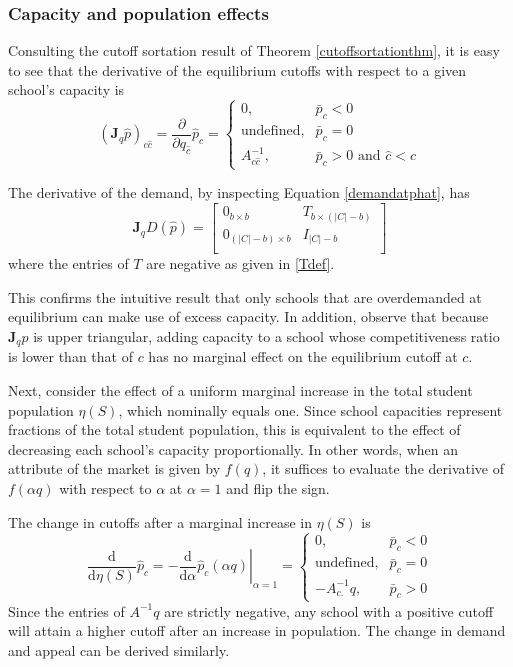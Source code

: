\documentclass[12pt]{article}
\theoremstyle{definition}
\begin{document}
\subsubsection{Capacity and population effects}
Consulting the cutoff sortation result of Theorem \ref{cutoffsortationthm}, it is easy to see that the derivative of the equilibrium cutoffs with respect to a given school's capacity is
\begin{equation}\label{jac-q-p}
\left(\mathbf{J}_q \hat p\right)_{c\hat c} =
\frac{\partial}{\partial q_{\hat c}} \hat p_c = \begin{cases}
0, & \bar p_c < 0 \\
\text{undefined}, & \bar p_c = 0 \\
A^{-1}_{c \hat c}, & \bar p_c > 0 \text{ and }\hat c < c 
\end{cases}
\end{equation}

The derivative of the demand, by inspecting Equation \eqref{demandatphat}, has
\begin{equation}\mathbf{J}_q D(\hat p) =
\begin{bmatrix}
0_{b \times b} & T_{b \times (|C| - b)} \\
0_{(|C| - b) \times b} & I_{|C| - b} \\
\end{bmatrix} 
\end{equation}
where the entries of $T$ are negative as given in \eqref{Tdef}.

This confirms the intuitive result that only schools that are overdemanded at equilibrium can make use of excess capacity. In addition, observe that because $\mathbf{J}_q \hat p$ is upper triangular, adding capacity to a school whose competitiveness ratio is lower than that of $c$ has no marginal effect on the equilibrium cutoff at $c$. 

Next, consider the effect of a uniform marginal increase in the total student population $\eta(S)$, which nominally equals one. Since school capacities represent fractions of the total student population, this is equivalent to the effect of decreasing each school's capacity proportionally. In other words, when an attribute of the market is given by $f(q)$, it suffices to evaluate the derivative of $f(\alpha q)$ with respect to $\alpha$ at $\alpha =1$ and flip the sign.

The change in cutoffs after a marginal increase in $\eta(S)$ is
\begin{equation}\label{d-population-p}
\frac{\mathrm{d}}{\mathrm{d}\eta(S)} \hat p_c = 
- \left.\frac{\mathrm{d}}{\mathrm{d}\alpha} \hat p_c(\alpha q)\right|_{\alpha=1} = \begin{cases}
0, & \bar p_c < 0 \\
\text{undefined}, & \bar p_c = 0 \\
-A^{-1}_{c .} q, & \bar p_c > 0
\end{cases}
\end{equation}
Since the entries of $A^{-1}q$ are strictly negative, any school with a positive cutoff will attain a higher cutoff after an increase in population. The change in demand and appeal can be derived similarly. 
\end{document}
